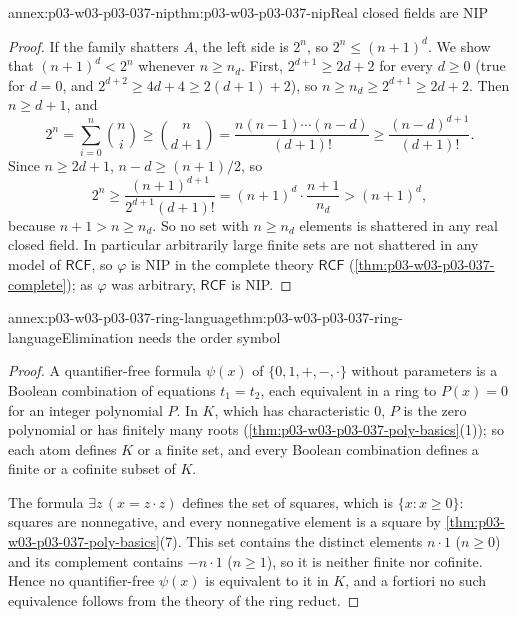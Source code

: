 \begin{annexitem}{annex:p03-w03-p03-037-nip}{thm:p03-w03-p03-037-nip}{Real closed fields are NIP}
\begin{proof}
If the family shatters \(A\), the left side is \(2^n\), so
\(2^n\leq(n+1)^d\).  We show that \((n+1)^d<2^n\) whenever \(n\geq n_d\).
First, \(2^{d+1}\geq2d+2\) for every \(d\geq0\) (true for \(d=0\), and
\(2^{d+2}\geq4d+4\geq2(d+1)+2\)), so \(n\geq n_d\geq2^{d+1}\geq2d+2\).  Then
\(n\geq d+1\), and
\[
2^n=\sum_{i=0}^{n}\binom ni\geq\binom n{d+1}
=\frac{n(n-1)\cdots(n-d)}{(d+1)!}\geq\frac{(n-d)^{d+1}}{(d+1)!}.
\]
Since \(n\geq2d+1\), \(n-d\geq(n+1)/2\), so
\[
2^n\geq\frac{(n+1)^{d+1}}{2^{d+1}(d+1)!}=(n+1)^d\cdot\frac{n+1}{n_d}>(n+1)^d,
\]
because \(n+1>n\geq n_d\).  So no set with \(n\geq n_d\) elements is
shattered in any real closed field.  In particular arbitrarily large finite
sets are not shattered in any model of \(\mathsf{RCF}\), so \(\varphi\) is NIP
in the complete theory \(\mathsf{RCF}\)
(\cref{thm:p03-w03-p03-037-complete}); as \(\varphi\) was arbitrary,
\(\mathsf{RCF}\) is NIP.
\end{proof}
\end{annexitem}

\begin{annexitem}{annex:p03-w03-p03-037-ring-language}{thm:p03-w03-p03-037-ring-language}{Elimination needs the order symbol}
\begin{proof}
A quantifier-free formula \(\psi(x)\) of \(\{0,1,+,-,\mathbin{\cdot}\}\)
without parameters is a Boolean combination of equations \(t_1=t_2\), each
equivalent in a ring to \(P(x)=0\) for an integer polynomial \(P\).  In
\(K\), which has characteristic \(0\), \(P\) is the zero polynomial or has
finitely many roots (\cref{thm:p03-w03-p03-037-poly-basics}(1)); so each
atom defines \(K\) or a finite set, and every Boolean combination defines a
finite or a cofinite subset of \(K\).

The formula \(\exists z\,(x=z\mathbin{\cdot}z)\) defines the set of squares,
which is \(\{x:x\geq0\}\): squares are nonnegative, and every nonnegative
element is a square by \cref{thm:p03-w03-p03-037-poly-basics}(7).  This set
contains the distinct elements \(n\cdot1\) (\(n\geq0\)) and its complement
contains \(-n\cdot1\) (\(n\geq1\)), so it is neither finite nor cofinite.
Hence no quantifier-free \(\psi(x)\) is equivalent to it in \(K\), and a
fortiori no such equivalence follows from the theory of the ring reduct.
\end{proof}
\end{annexitem}

